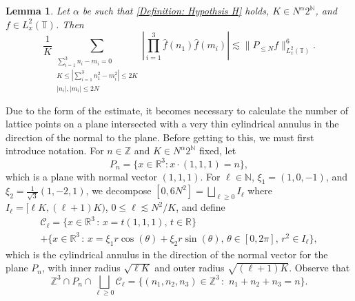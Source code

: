 \documentclass[12pt, letterpaper]{amsart}
\newtheorem{lemma}{Lemma}
\begin{document}
\begin{lemma}\label{Lemma: Dyadic component bound}
    Let $\alpha$ be such that \ref{Definition: Hypothsis H} holds, $K\in N^\alpha2^\mathbb{N}$, and $f\in L^2_x(\mathbb{T})$. Then 
    \[
\frac{1}{K}\sum_{\substack{\sum_{i=1}^3 n_i-m_i = 0\\ K\leq \left|\sum_{i=1}^3 n_1^2-m_i^2\right|\leq 2K\\ |n_i|,|m_i|\leq 2N}}|\prod_{i=1}^3\widehat{f}(n_1)\widehat{f}(m_i)| \lesssim \|P_{\leq N}f\|_{L^2_x(\mathbb{T})}^6.
    \]
\end{lemma}
Due to the form of the estimate, it becomes necessary to calculate the number of lattice points on a plane intersected with a very thin cylindrical annulus in the direction of the normal to the plane. Before getting to this, we must first introduce notation. For $n\in\mathbb{Z}$ and $K\in N^\alpha2^\mathbb{N}$ fixed, let 
\[
P_n = \{x\in\mathbb{R}^3 : x\cdot(1,1,1) = n\},
\]
which is a plane with normal vector $(1,1,1)$. For $\ell\in\mathbb{N}$, $\xi_1 = (1,0,-1)$, and $\xi_2 = \tfrac{1}{\sqrt{3}}(1,-2,1)$, we decompose $[0,6N^2] = \bigsqcup_{\ell\geq 0} I_\ell$ where $I_\ell = [\ell K, (\ell+1)K)$, $0\leq \ell\lesssim N^2/K$, and define 
\begin{multline*}
\mathcal{C}_\ell =  \{x\in \mathbb{R}^3\,:\,x = t(1,1,1),\,t\in\mathbb{R}\}\\
+ \{x\in\mathbb{R}^3\,:\,x = \xi_1 r\cos(\theta) + \xi_2 r\sin(\theta),\,\theta\in[0,2\pi],\,r^2\in I_\ell\},
\end{multline*}
which is the cylindrical annulus in the direction of the normal vector for the plane $P_n$, with inner radius $\sqrt{\ell K}$ and outer radius $\sqrt{(\ell+1)K}$. Observe that 
\[
\mathbb{Z}^3\cap P_n\cap\bigsqcup_{\ell\geq 0}\mathcal{C}_\ell = \{(n_1,n_2,n_3)\in\mathbb{Z}^3\,:\,\,n_1+n_2+n_3=n\}.
\]
\end{document}
